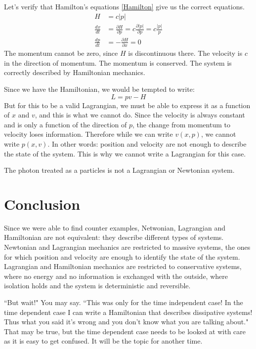 \documentclass[11pt]{article}
\begin{document}
Let's verify that Hamilton's equations \eqref{Hamilton} give us the correct equations.
\begin{align*}
	H &= c|p| \\
	\frac{dx}{dt} &= \frac{\partial H}{\partial p} = c \frac{\partial |p|}{\partial p} = c \frac{|p|}{p} \\
	\frac{dp}{dt} &= - \frac{\partial H}{\partial x} = 0
\end{align*}
The momentum cannot be zero, since $H$ is discontinuous there. The velocity is $c$ in the direction of momentum. The momentum is conserved. The system is correctly described by Hamiltonian mechanics.

Since we have the Hamiltonian, we would be tempted to write:
\begin{equation}
	\label{Legendre}
	L = pv - H
\end{equation}
But for this to be a valid Lagrangian, we must be able to express it as a function of $x$ and $v$, and this is what we cannot do. Since the velocity is always constant and is only a function of the direction of $p$, the change from momentum to velocity loses information. Therefore while we can write $v(x,p)$, we cannot write $p(x,v)$. In other words: position and velocity are not enough to describe the state of the system. This is why we cannot write a Lagrangian for this case.

The photon treated as a particles is not a Lagrangian or Newtonian system.

\section{Conclusion}

Since we were able to find counter examples, Netwonian, Lagrangian and Hamiltonian are not equivalent: they describe different types of systems. Newtonian and Lagrangian mechanics are restricted to massive systems, the ones for which position and velocity are enough to identify the state of the system. Lagrangian and Hamiltonian mechanics are restricted to conservative systems, where no energy and no information is exchanged with the outside, where isolation holds and the system is deterministic and reversible.

``But wait!" You may say. ``This was only for the time independent case! In the time dependent case I can write a Hamiltonian that describes dissipative systems! Thus what you said it's wrong and you don't know what you are talking about." That may be true, but the time dependent case needs to be looked at with care as it is easy to get confused. It will be the topic for another time.
\end{document}
